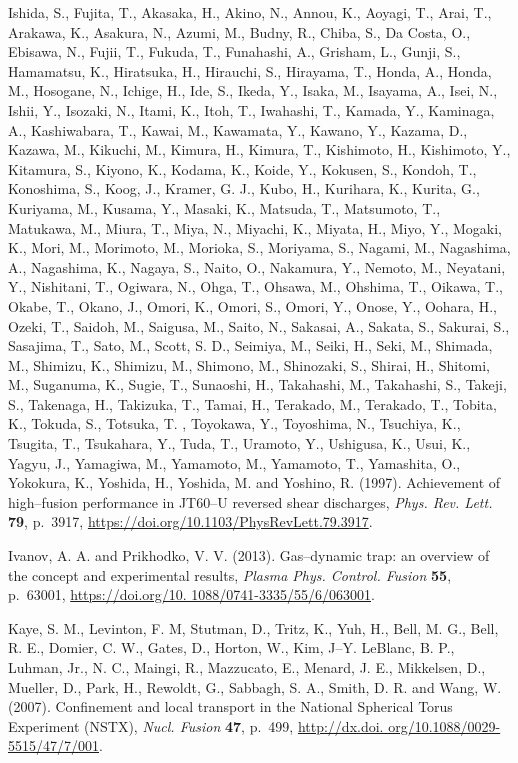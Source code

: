 \documentclass[a4paper,openany,12pt]{book}
\begin{document}
\begin{thebibliography}{100}
\bibitem{}
Ishida, S., Fujita, T., Akasaka, H., Akino, N., Annou, K., Aoyagi, T., Arai, T., Arakawa, K., Asakura, N., Azumi, M., Budny, R., Chiba, S., Da Costa, O., Ebisawa, N., Fujii, T., Fukuda, T., Funahashi, A., Grisham, L., Gunji, S., Hamamatsu, K., Hiratsuka, H., Hirauchi, S., Hirayama, T., Honda, A., Honda, M., Hosogane, N., Ichige, H., Ide, S., Ikeda, Y., Isaka, M., Isayama, A., Isei, N., Ishii, Y., Isozaki, N., Itami, K., Itoh, T., Iwahashi, T., Kamada, Y., Kaminaga, A., Kashiwabara, T., Kawai, M., Kawamata, Y., Kawano, Y., Kazama, D., Kazawa, M., Kikuchi, M., Kimura, H., Kimura, T., Kishimoto, H., Kishimoto, Y., Kitamura, S., Kiyono, K., Kodama, K., Koide, Y., Kokusen, S., Kondoh, T., Konoshima, S., Koog, J., Kramer, G. J., Kubo, H., Kurihara, K., Kurita, G., Kuriyama, M., Kusama, Y., Masaki, K., Matsuda, T., Matsumoto, T., Matukawa, M., Miura, T., Miya, N., Miyachi, K., Miyata, H., Miyo, Y., Mogaki, K., Mori, M., Morimoto, M., Morioka, S., Moriyama, S., Nagami, M., Nagashima, A., Nagashima, K., Nagaya, S., Naito, O., Nakamura, Y., Nemoto, M., Neyatani, Y., Nishitani, T., Ogiwara, N., Ohga, T., Ohsawa, M., Ohshima, T., Oikawa, T., Okabe, T., Okano, J., Omori, K., Omori, S., Omori, Y., Onose, Y., Oohara, H., Ozeki, T., Saidoh, M., Saigusa, M., Saito, N., Sakasai, A., Sakata, S., Sakurai, S., Sasajima, T., Sato, M., Scott, S. D., Seimiya, M., Seiki, H., Seki, M., Shimada, M., Shimizu, K., Shimizu, M., Shimono, M., Shinozaki, S., Shirai, H., Shitomi, M., Suganuma, K., Sugie, T., Sunaoshi, H., Takahashi, M., Takahashi, S., Takeji, S., Takenaga, H., Takizuka, T., Tamai, H., Terakado, M., Terakado, T., Tobita, K., Tokuda, S., Totsuka, T. , Toyokawa, Y., Toyoshima, N., Tsuchiya, K., Tsugita, T., Tsukahara, Y., Tuda, T., Uramoto, Y., Ushigusa, K., Usui, K., Yagyu, J., Yamagiwa, M., Yamamoto, M., Yamamoto, T., Yamashita, O., Yokokura, K., Yoshida, H., Yoshida, M. and Yoshino, R. (1997). Achievement of high--fusion performance in JT60--U reversed shear discharges, \emph{Phys. Rev. Lett.} \textbf{79}, p.~3917, \url{https://doi.org/10.1103/PhysRevLett.79.3917}.

\bibitem{}
Ivanov, A. A. and Prikhodko, V. V. (2013). Gas--dynamic trap: an overview of the concept and experimental results, \emph{Plasma Phys. Control. Fusion} \textbf{55}, p.~63001, \url{https://doi.org/10. 1088/0741-3335/55/6/063001}.

\bibitem{}
Kaye, S. M., Levinton, F. M, Stutman, D., Tritz, K., Yuh, H., Bell, M. G., Bell, R. E., Domier, C. W., Gates, D., Horton, W., Kim, J--Y. LeBlanc, B. P., Luhman, Jr., N. C., Maingi, R., Mazzucato, E., Menard, J. E., Mikkelsen, D., Mueller, D., Park, H., Rewoldt, G., Sabbagh, S. A., Smith, D. R. and Wang, W. (2007). Confinement and local transport in the National Spherical Torus Experiment (NSTX), \emph{Nucl. Fusion} \textbf{47}, p.~499, 
\url{http://dx.doi. org/10.1088/0029-5515/47/7/001}.


\end{thebibliography}
\end{document}

